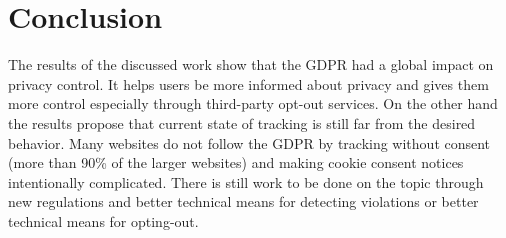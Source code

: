 \section{Conclusion}
\label{sec:conclusion}

The results of the discussed work show that the GDPR had a global impact on privacy control. It helps users be more
informed about privacy and gives them more control especially through third-party opt-out services. On the other hand
the results propose that current state of tracking is still far from the desired behavior. Many websites do not follow
the GDPR by tracking without consent (more than 90\% of the larger websites) and making cookie consent notices intentionally complicated. There is still
work to be done on the topic through new regulations and better technical means for detecting violations or better
technical means for opting-out.


